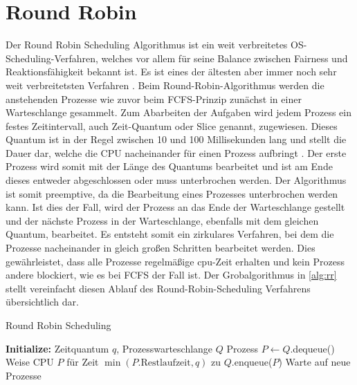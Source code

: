 
\section{Round Robin}

Der Round Robin Scheduling Algorithmus ist ein weit verbreitetes OS-Scheduling-Verfahren, welches vor allem für seine Balance zwischen Fairness und Reaktionsfähigkeit bekannt ist. Es ist eines der ältesten aber immer noch sehr weit verbreitetsten Verfahren \cite[S.158]{Tanenbaum.2024}.  
Beim Round-Robin-Algorithmus werden die anstehenden Prozesse wie zuvor beim \ac{FCFS}-Prinzip zunächst in einer Warteschlange gesammelt. Zum Abarbeiten der Aufgaben wird jedem Prozess ein festes Zeitintervall, auch Zeit-Quantum oder Slice genannt, zugewiesen. Dieses Quantum ist in der Regel zwischen 10 und 100 Millisekunden lang und stellt die Dauer dar, welche die CPU nacheinander für einen Prozess aufbringt \cite[S.209]{Silberschatz.2019}. Der erste Prozess wird somit mit der Länge des Quantums bearbeitet und ist am Ende dieses entweder abgeschlossen oder muss unterbrochen werden. Der Algorithmus ist somit preemptive, da die Bearbeitung eines Prozesses unterbrochen werden kann. Ist dies der Fall, wird der Prozess an das Ende der Warteschlange gestellt und der nächste Prozess in der Warteschlange, ebenfalls mit dem gleichen Quantum, bearbeitet. Es entsteht somit ein zirkulares Verfahren, bei dem die Prozesse nacheinander in gleich großen Schritten bearbeitet werden. Dies gewährleistet, dass alle Prozesse regelmäßige \ac{cpu}-Zeit erhalten und kein Prozess andere blockiert, wie es bei \ac{FCFS} der Fall ist. Der Grobalgorithmus in \ref{alg:rr} stellt vereinfacht diesen Ablauf des Round-Robin-Scheduling Verfahrens übersichtlich dar.

\begin{algorithm} 
\caption{Round Robin Scheduling} \label{alg:rr}
\begin{algorithmic}[1]
	\State \textbf{Initialize:} Zeitquantum $q$, Prozesswarteschlange $Q$
	\State Prozess $P \gets Q$.dequeue()
	\State Weise CPU $P$ für Zeit $\min(P.\text{Restlaufzeit}, q)$ zu
	\State $Q$.enqueue($P$) 
	\EndIf
	\State Warte auf neue Prozesse
	\EndIf
	\EndWhile
\end{algorithmic}
\end{algorithm}

